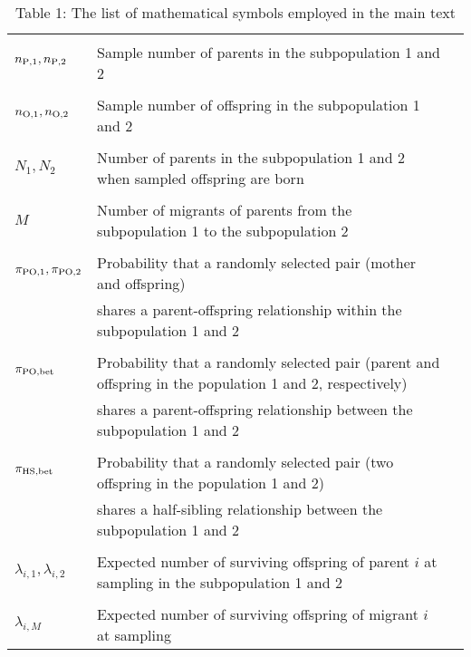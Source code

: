 \documentclass[AMA,STIX1COL]{WileyNJD-v2}
\begin{document}
\renewcommand{\arraystretch}{0.6}
\begin{table}[tb]
\begin{center}
   \caption[]{Table 1: The list of mathematical symbols employed in the main text}
    \textbf {}\\[-4mm]
    \begin{tabular}{llc} \hline
       & & \\
	$n_{\rm P,1}, n_{\rm P, 2}$			& Sample number of parents in the subpopulation 1 and 2\\ 
		                						& \\
	$n_{\rm O, 1}, n_{\rm O, 2}$			& Sample number of offspring in the subpopulation 1 and 2\\ 
		                						& \\
	$N_{1}, N_{2}$						& Number of parents in the subpopulation 1 and 2 when sampled offspring are born\\
		                						& \\
	$M$								& Number of migrants of parents from the subpopulation 1 to the subpopulation 2\\
		                						& \\
	$\pi_{\rm PO,1}, \pi_{\rm PO,2}$		& Probability that a randomly selected pair (mother and offspring) \\
	                							& shares a parent-offspring relationship within the subpopulation 1 and 2\\
									& \\
	$\pi_{\rm PO, bet}$					& Probability that a randomly selected pair (parent and offspring in the population 1 and 2, respectively) \\
	                							& shares a parent-offspring relationship between the subpopulation 1 and 2\\
									& \\
	$\pi_{\rm HS, bet}$					& Probability that a randomly selected pair (two offspring in the population 1 and 2) \\
	                							& shares a half-sibling relationship between the subpopulation 1 and 2\\
					                			& \\
	$\lambda_{i,1}, \lambda_{i,2}$			& Expected number of surviving offspring of parent $i$ at sampling in the subpopulation 1 and 2\\
		                						& \\
	$\lambda_{i, M}$					& Expected number of surviving offspring of migrant $i$ at sampling\\

\end{tabular}
\end{center}
\end{table}
\end{document}

